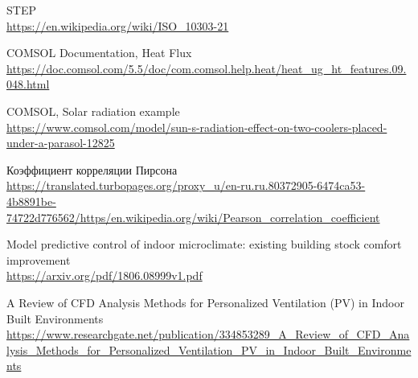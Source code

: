 \documentclass[a4paper,article,14pt]{extarticle}
\begin{document}
\begin{thebibliography}{1}
 STEP\\
\url{https://en.wikipedia.org/wiki/ISO_10303-21}

 COMSOL Documentation, Heat Flux\\
\url{https://doc.comsol.com/5.5/doc/com.comsol.help.heat/heat_ug_ht_features.09.048.html}

 COMSOL, Solar radiation example\\
\url{https://www.comsol.com/model/sun-s-radiation-effect-on-two-coolers-placed-under-a-parasol-12825}

 Коэффициент корреляции Пирсона\\
\url{https://translated.turbopages.org/proxy_u/en-ru.ru.80372905-6474ca53-4b8891be-74722d776562/https/en.wikipedia.org/wiki/Pearson_correlation_coefficient}



 Model predictive control of indoor microclimate: existing building stock comfort improvement\\
\url{https://arxiv.org/pdf/1806.08999v1.pdf}

 A Review of CFD Analysis Methods for Personalized Ventilation (PV) in Indoor Built Environments\\
\url{https://www.researchgate.net/publication/334853289_A_Review_of_CFD_Analysis_Methods_for_Personalized_Ventilation_PV_in_Indoor_Built_Environments}
\end{thebibliography}
\end{document}
